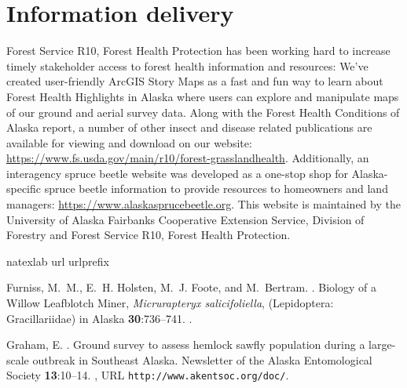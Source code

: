 \section{Information delivery}

 Forest Service R10, Forest Health Protection has been working hard to increase timely stakeholder access to forest health information and resources: We’ve created user-friendly  ArcGIS Story Maps as a fast and fun way to learn about Forest Health Highlights in Alaska where users can explore and manipulate maps of our ground and aerial survey data. Along with the Forest Health Conditions of Alaska report, a number of other insect and disease related publications are available for viewing and download on our website: \url{https://www.fs.usda.gov/main/r10/forest-grasslandhealth}. Additionally, an interagency spruce beetle website was developed as a one-stop shop for Alaska-specific spruce beetle information to provide resources to homeowners and land managers: \url{https://www.alaskasprucebeetle.org}. This website is maintained by the University of Alaska Fairbanks Cooperative Extension Service,  Division of Forestry and  Forest Service R10, Forest Health Protection.

%

\begin{thebibliography}{2}
\expandafter\ifx\csname natexlab\endcsname\relax\def\natexlab#1{#1}\fi
\expandafter\ifx\csname url\endcsname\relax
  \def\url#1{{\tt #1}}\fi
\expandafter\ifx\csname urlprefix\endcsname\relax\def\urlprefix{{\small URL}
  }\fi

Furniss, M.~M., E.~H. Holsten, M.~J. Foote, and M.~Bertram.
.
\newblock Biology of a Willow Leafblotch Miner, \textit{Micrurapteryx
  salicifoliella}, (Lepidoptera: Gracillariidae) in Alaska {\bfseries
  30}:736--741.
\newblock {}.

Graham, E.
.
\newblock Ground survey to assess hemlock sawfly population during a
  large-scale outbreak in Southeast Alaska.
\newblock Newsletter of the Alaska Entomological Society {\bfseries 13}:10--14.
\newblock {}, \urlprefix\url{http://www.akentsoc.org/doc/}.

\end{thebibliography}


